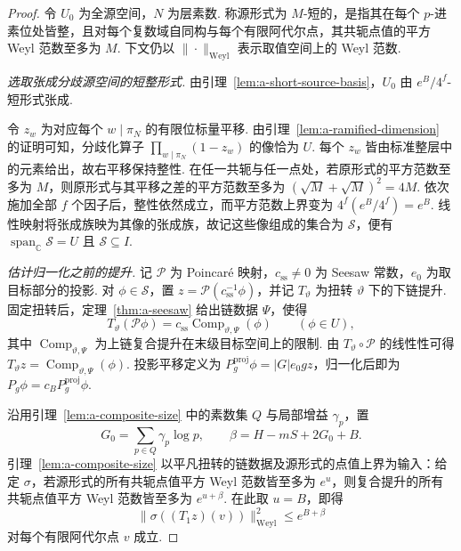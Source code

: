 \begin{proof}
令 $U_0$ 为全源空间，$N$ 为层素数. 称源形式为 $M$-短的，是指其在每个 $p$-进素位处皆整，且对每个复数域自同构与每个有限阿代尔点，其共轭点值的平方 Weyl 范数至多为 $M$. 下文仍以 $\|\cdot\|_{\mathrm{Weyl}}$ 表示取值空间上的 Weyl 范数.

\emph{选取张成分歧源空间的短整形式.}
由引理~\ref{lem:a-short-source-basis}，$U_0$ 由 $e^B/4^f$-短形式张成.

令 $z_w$ 为对应每个 $w\mid\pi_N$ 的有限位标量平移. 由引理~\ref{lem:a-ramified-dimension} 的证明可知，分歧化算子 $\prod_{w\mid\pi_N}(1-z_w)$ 的像恰为 $U$. 每个 $z_w$ 皆由标准整层中的元素给出，故右平移保持整性. 在任一共轭与任一点处，若原形式的平方范数至多为 $M$，则原形式与其平移之差的平方范数至多为 $(\sqrt M+\sqrt M)^2=4M$. 依次施加全部 $f$ 个因子后，整性依然成立，而平方范数上界变为 $4^f(e^B/4^f)=e^B$. 线性映射将张成族映为其像的张成族，故记这些像组成的集合为 $\mathcal S$，便有 $\operatorname{span}_{\mathbb C}\mathcal S=U$ 且 $\mathcal S\subseteq I$.

\emph{估计归一化之前的提升.}
记 $\mathcal P$ 为 Poincaré 映射，$c_{\mathrm{ss}}\ne0$ 为 Seesaw 常数，$e_0$ 为取目标部分的投影. 对 $\phi\in\mathcal S$，置 $z=\mathcal P(c_{\mathrm{ss}}^{-1}\phi)$，并记 $T_\vartheta$ 为扭转 $\vartheta$ 下的下链提升. 固定扭转后，定理~\ref{thm:a-seesaw} 给出链数据 $\Psi$，使得
\[
 T_\vartheta(\mathcal P\phi)=
 c_{\mathrm{ss}}\operatorname{Comp}_{\vartheta,\Psi}(\phi)
 \qquad (\phi\in U),
\]
其中 $\operatorname{Comp}_{\vartheta,\Psi}$ 为上链复合提升在末级目标空间上的限制. 由 $T_\vartheta\circ\mathcal P$ 的线性性可得
$T_\vartheta z=\operatorname{Comp}_{\vartheta,\Psi}(\phi)$. 投影平移定义为 $P_g^{\mathrm{proj}}\phi=|G|e_0gz$，归一化后即为 $P_g\phi=c_B P_g^{\mathrm{proj}}\phi$.

沿用引理~\ref{lem:a-composite-size} 中的素数集 $Q$ 与局部增益 $\gamma_p$，置
\[
 G_0=\sum_{p\in Q}\gamma_p\log p,\qquad
 \beta=H-mS+2G_0+B .
\]
引理~\ref{lem:a-composite-size} 以平凡扭转的链数据及源形式的点值上界为输入：给定 $\sigma$，若源形式的所有共轭点值平方 Weyl 范数皆至多为 $e^u$，则复合提升的所有共轭点值平方 Weyl 范数皆至多为 $e^{u+\beta}$. 在此取 $u=B$，即得
\[
 \|\sigma((T_1 z)(v))\|_{\mathrm{Weyl}}^2\le e^{B+\beta}
\]
对每个有限阿代尔点 $v$ 成立.


\end{proof}
